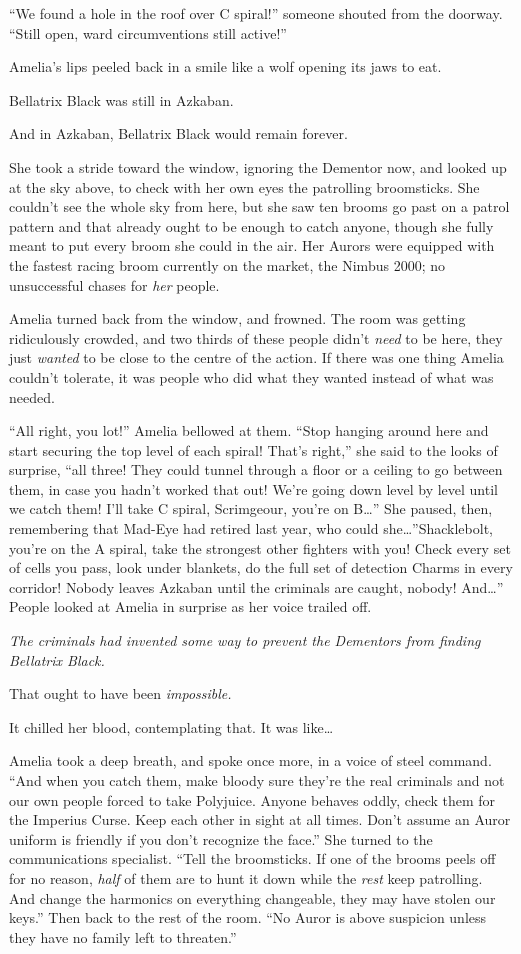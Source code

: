 “We found a hole in the roof over C spiral!” someone shouted from the doorway. “Still open, ward circumventions still active!”

Amelia’s lips peeled back in a smile like a wolf opening its jaws to eat.

Bellatrix Black was still in Azkaban.

And in Azkaban, Bellatrix Black would remain forever.

She took a stride toward the window, ignoring the Dementor now, and looked up at the sky above, to check with her own eyes the patrolling broomsticks. She couldn’t see the whole sky from here, but she saw ten brooms go past on a patrol pattern and that already ought to be enough to catch anyone, though she fully meant to put every broom she could in the air. Her Aurors were equipped with the fastest racing broom currently on the market, the Nimbus 2000; no unsuccessful chases for \emph{her} people.

Amelia turned back from the window, and frowned. The room was getting ridiculously crowded, and two thirds of these people didn’t \emph{need} to be here, they just \emph{wanted} to be close to the centre of the action. If there was one thing Amelia couldn’t tolerate, it was people who did what they wanted instead of what was needed.

“All right, you lot!” Amelia bellowed at them. “Stop hanging around here and start securing the top level of each spiral! That’s right,” she said to the looks of surprise, “all three! They could tunnel through a floor or a ceiling to go between them, in case you hadn’t worked that out! We’re going down level by level until we catch them! I’ll take C spiral, Scrimgeour, you’re on B…” She paused, then, remembering that Mad-Eye had retired last year, who could she…”Shacklebolt, you’re on the A spiral, take the strongest other fighters with you! Check every set of cells you pass, look under blankets, do the full set of detection Charms in every corridor! Nobody leaves Azkaban until the criminals are caught, nobody! And…” People looked at Amelia in surprise as her voice trailed off.

\emph{The criminals had invented some way to prevent the Dementors from finding Bellatrix Black.}

That ought to have been \emph{impossible.}

It chilled her blood, contemplating that. It was like…

Amelia took a deep breath, and spoke once more, in a voice of steel command. “And when you catch them, make bloody sure they’re the real criminals and not our own people forced to take Polyjuice. Anyone behaves oddly, check them for the Imperius Curse. Keep each other in sight at all times. Don’t assume an Auror uniform is friendly if you don’t recognize the face.” She turned to the communications specialist. “Tell the broomsticks. If one of the brooms peels off for no reason, \emph{half} of them are to hunt it down while the \emph{rest} keep patrolling. And change the harmonics on everything changeable, they may have stolen our keys.” Then back to the rest of the room. “No Auror is above suspicion unless they have no family left to threaten.”

